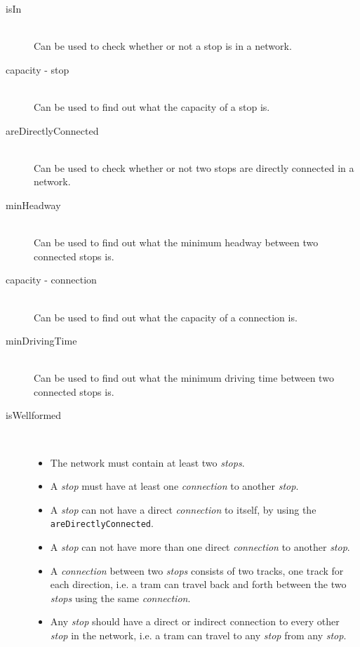 \documentclass[a4]{article}
\begin{document}
\begin{description}
    \item[isIn] \hfill \\ Can be used to check whether or not a stop is in a network.
    \item[capacity - stop] \hfill \\ Can be used to find out what the capacity of a stop is.
    \item[areDirectlyConnected] \hfill \\ Can be used to check whether or not two stops are directly connected in a network.
    \item[minHeadway] \hfill \\ Can be used to find out what the minimum headway between two connected stops is.
    \item[capacity - connection] \hfill \\ Can be used to find out what the capacity of a connection is.
    \item[minDrivingTime] \hfill \\ Can be used to find out what the minimum driving time between two connected stops is.
    \item[isWellformed] \hfill \\ 
        \begin{itemize}
            \item The network must contain at least two \emph{stops}.
            \item A \emph{stop} must have at least one \emph{connection} to another \emph{stop}.
            \item A \emph{stop} can not have a direct \emph{connection} to itself, by using the \verb=areDirectlyConnected=.
            \item A \emph{stop} can not have more than one direct \emph{connection} to another \emph{stop}.
            \item A \emph{connection} between two \emph{stops} consists of two tracks, one track for each direction, i.e. a tram can travel back and forth between the two \emph{stops} using the same \emph{connection}.
            \item Any \emph{stop} should have a direct or indirect connection to every other \emph{stop} in the network, i.e. a tram can travel to any \emph{stop} from any \emph{stop}.
        \end{itemize}
\end{description}
\end{document}
